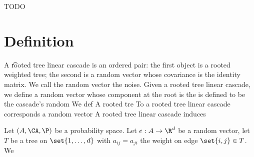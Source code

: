 

TODO

\section{Definition}

A \t{rooted tree linear cascade} is an ordered pair: the first object is a rooted weighted tree; the second is a random vector whose covariance is the identity matrix.
We call the random vector the noise.
Given a rooted tree linear cascade, we define a random vector whose component at the root is the is defined to be the cascade's random
We def
A rooted tre
To a rooted tree linear cascade corresponds a random vector
A rooted tree linear cascade induces


Let $(A, \CA, \P)$ be a probability space.
Let $e: A \to \R^d$ be a random vector, let $T$ be a tree on $\set{1, \dots, d}$ with $a_{ij} = a_{ji}$ the weight on edge $\set{i, j} \in T$.
We


